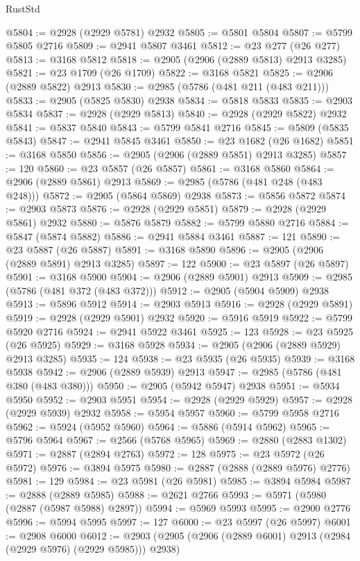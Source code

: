 \begin{lexlean}{RustStd}
\begin{coremodule}
{\begin{coremodule}
{{{{{{{{{{{{{{{{{{{{{{{{{{{{{{{{{{{{{{{{{{{{{{{{{{{{{{{{{{{{{{{{{{{{{{{{{{{{{{@5804 := @2928 (@2929 @5781) @2932
@5805 := @5801 @5804
@5807 := @5799 @5805 @2716
@5809 := @2941 @5807 @3461
@5812 := @23 @277 (@26 @277)
@5813 := @3168 @5812
@5818 := @2905 (@2906 (@2889 @5813) @2913 @3285)
@5821 := @23 @1709 (@26 @1709)
@5822 := @3168 @5821
@5825 := @2906 (@2889 @5822) @2913
@5830 := @2985 (@5786 (@481 @211 (@483 @211)))
@5833 := @2905 (@5825 @5830) @2938
@5834 := @5818 @5833
@5835 := @2903 @5834
@5837 := @2928 (@2929 @5813)
@5840 := @2928 (@2929 @5822) @2932
@5841 := @5837 @5840
@5843 := @5799 @5841 @2716
@5845 := @5809 (@5835 @5843)
@5847 := @2941 @5845 @3461
@5850 := @23 @1682 (@26 @1682)
@5851 := @3168 @5850
@5856 := @2905 (@2906 (@2889 @5851) @2913 @3285)
@5857 := 120
@5860 := @23 @5857 (@26 @5857)
@5861 := @3168 @5860
@5864 := @2906 (@2889 @5861) @2913
@5869 := @2985 (@5786 (@481 @248 (@483 @248)))
@5872 := @2905 (@5864 @5869) @2938
@5873 := @5856 @5872
@5874 := @2903 @5873
@5876 := @2928 (@2929 @5851)
@5879 := @2928 (@2929 @5861) @2932
@5880 := @5876 @5879
@5882 := @5799 @5880 @2716
@5884 := @5847 (@5874 @5882)
@5886 := @2941 @5884 @3461
@5887 := 121
@5890 := @23 @5887 (@26 @5887)
@5891 := @3168 @5890
@5896 := @2905 (@2906 (@2889 @5891) @2913 @3285)
@5897 := 122
@5900 := @23 @5897 (@26 @5897)
@5901 := @3168 @5900
@5904 := @2906 (@2889 @5901) @2913
@5909 := @2985 (@5786 (@481 @372 (@483 @372)))
@5912 := @2905 (@5904 @5909) @2938
@5913 := @5896 @5912
@5914 := @2903 @5913
@5916 := @2928 (@2929 @5891)
@5919 := @2928 (@2929 @5901) @2932
@5920 := @5916 @5919
@5922 := @5799 @5920 @2716
@5924 := @2941 @5922 @3461
@5925 := 123
@5928 := @23 @5925 (@26 @5925)
@5929 := @3168 @5928
@5934 := @2905 (@2906 (@2889 @5929) @2913 @3285)
@5935 := 124
@5938 := @23 @5935 (@26 @5935)
@5939 := @3168 @5938
@5942 := @2906 (@2889 @5939) @2913
@5947 := @2985 (@5786 (@481 @380 (@483 @380)))
@5950 := @2905 (@5942 @5947) @2938
@5951 := @5934 @5950
@5952 := @2903 @5951
@5954 := @2928 (@2929 @5929)
@5957 := @2928 (@2929 @5939) @2932
@5958 := @5954 @5957
@5960 := @5799 @5958 @2716
@5962 := @5924 (@5952 @5960)
@5964 := @5886 (@5914 @5962)
@5965 := @5796 @5964
@5967 := @2566 (@5768 @5965)
@5969 := @2880 (@2883 @1302)
@5971 := @2887 (@2894 @2763)
@5972 := 128
@5975 := @23 @5972 (@26 @5972)
@5976 := @3894 @5975
@5980 := @2887 (@2888 (@2889 @5976) @2776)
@5981 := 129
@5984 := @23 @5981 (@26 @5981)
@5985 := @3894 @5984
@5987 := @2888 (@2889 @5985)
@5988 := @2621 @2766
@5993 := @5971 (@5980 (@2887 (@5987 @5988) @2897))
@5994 := @5969 @5993
@5995 := @2900 @2776
@5996 := @5994 @5995
@5997 := 127
@6000 := @23 @5997 (@26 @5997)
@6001 := @2908 @6000
@6012 := @2903 (@2905 (@2906 (@2889 @6001) @2913 (@2984 (@2929 @5976) (@2929 @5985))) @2938)
}}}}}}}}}}}}}}}}}}}}}}}}}}}}}}}}}}}}}}}}}}}}}}}}}}}}}}}}}}}}}}}}}}}}}}}}}}}}}}
\end{coremodule}}
\end{coremodule}
\end{lexlean}
